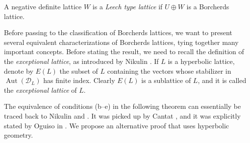 \documentclass[11pt,letterpaper]{amsart}
\DeclareMathOperator{\Aut}{Aut}
\begin{document}
\begin{definition}
A negative definite lattice $W$ is a \emph{Leech type lattice} if $U\oplus W$ is a Borcherds lattice.
\end{definition}

Before passing to the classification of Borcherds lattices, we want to present several equivalent characterizations of Borcherds lattices, tying together many important concepts.
Before stating the result, we need to recall the definition of the \emph{exceptional lattice}, as introduced by Nikulin \cite[{\S}4]{nikulin.elliptic}. If $L$ is a hyperbolic lattice, denote by $E(L)$ the subset of $L$ containing the vectors whose stabilizer in $\Aut(\mathcal{D}_L)$ has finite index. Clearly $E(L)$ is a sublattice of $L$, and it is called the \emph{exceptional lattice} of $L$.

The equivalence of conditions (b--e) in the following theorem can essentially be traced back to Nikulin \cite[Theorem~9.1.1]{nikulin.factor.groups} and \cite[{\S}4]{nikulin.elliptic}. It was picked up by Cantat \cite{cantat.dynamics.K3.1, cantat.dynamics.K3.2}, and it was explicitly stated by Oguiso in \cite[Theorems~1.6~and~2.1]{oguiso.entropy}. We propose an alternative proof that uses hyperbolic geometry.
\end{document}
